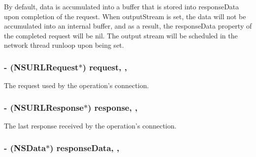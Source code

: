By default, data is accumulated into a buffer that is stored into {\ttfamily response\-Data} upon completion of the request. When {\ttfamily output\-Stream} is set, the data will not be accumulated into an internal buffer, and as a result, the {\ttfamily response\-Data} property of the completed request will be {\ttfamily nil}. The output stream will be scheduled in the network thread runloop upon being set. \hypertarget{interface_a_f_u_r_l_connection_operation_a5c453587e9d26f9e3ce3ac1e3c294d61}{
\subsubsection[{request}]{\setlength{\rightskip}{0pt plus 5cm}-\/ (N\-S\-U\-R\-L\-Request$\ast$) request\hspace{0.3cm}{\ttfamily [read]}, {\ttfamily [nonatomic]}, {\ttfamily [strong]}}}\label{interface_a_f_u_r_l_connection_operation_a5c453587e9d26f9e3ce3ac1e3c294d61}
The request used by the operation's connection. \hypertarget{interface_a_f_u_r_l_connection_operation_ac7d24cbe5ff6720b0d5f330c840cb434}{
\subsubsection[{response}]{\setlength{\rightskip}{0pt plus 5cm}-\/ (N\-S\-U\-R\-L\-Response$\ast$) response\hspace{0.3cm}{\ttfamily [read]}, {\ttfamily [nonatomic]}, {\ttfamily [strong]}}}\label{interface_a_f_u_r_l_connection_operation_ac7d24cbe5ff6720b0d5f330c840cb434}
The last response received by the operation's connection. \hypertarget{interface_a_f_u_r_l_connection_operation_aee9d9fd0cd4ff4cea1dd9f564ea487ef}{
\subsubsection[{response\-Data}]{\setlength{\rightskip}{0pt plus 5cm}-\/ (N\-S\-Data$\ast$) response\-Data\hspace{0.3cm}{\ttfamily [read]}, {\ttfamily [nonatomic]}, {\ttfamily [strong]}}}\label{interface_a_f_u_r_l_connection_operation_aee9d9fd0cd4ff4cea1dd9f564ea487ef}
